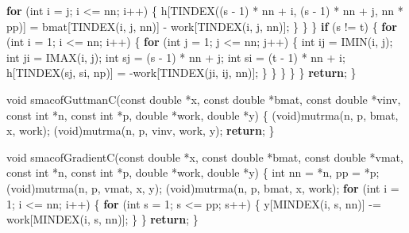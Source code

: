 \documentclass[12pt,]{article}
\newenvironment{Shaded}{\begin{snugshade}}{\end{snugshade}}
\newcommand{\DataTypeTok}[1]{\textcolor[rgb]{0.13,0.29,0.53}{#1}}
\newcommand{\DecValTok}[1]{\textcolor[rgb]{0.00,0.00,0.81}{#1}}
\newcommand{\ControlFlowTok}[1]{\textcolor[rgb]{0.13,0.29,0.53}{\textbf{#1}}}
\newcommand{\NormalTok}[1]{#1}
\begin{document}
\begin{Shaded}
\begin{Highlighting}[]
                    \ControlFlowTok{for}\NormalTok{ (}\DataTypeTok{int}\NormalTok{ i = j; i <= nn; i++) \{}
\NormalTok{                        h[TINDEX((s - }\DecValTok{1}\NormalTok{) * nn + i, (s - }\DecValTok{1}\NormalTok{) * nn + j, nn * pp)] =}
\NormalTok{                            bmat[TINDEX(i, j, nn)] - work[TINDEX(i, j, nn)];}
\NormalTok{                    \}}
\NormalTok{                \}}
\NormalTok{            \}}
            \ControlFlowTok{if}\NormalTok{ (s != t) \{}
                \ControlFlowTok{for}\NormalTok{ (}\DataTypeTok{int}\NormalTok{ i = }\DecValTok{1}\NormalTok{; i <= nn; i++) \{}
                    \ControlFlowTok{for}\NormalTok{ (}\DataTypeTok{int}\NormalTok{ j = }\DecValTok{1}\NormalTok{; j <= nn; j++) \{}
                        \DataTypeTok{int}\NormalTok{ ij = IMIN(i, j);}
                        \DataTypeTok{int}\NormalTok{ ji = IMAX(i, j);}
                        \DataTypeTok{int}\NormalTok{ sj = (s - }\DecValTok{1}\NormalTok{) * nn + j;}
                        \DataTypeTok{int}\NormalTok{ si = (t - }\DecValTok{1}\NormalTok{) * nn + i;}
\NormalTok{                        h[TINDEX(sj, si, np)] = -work[TINDEX(ji, ij, nn)];}
\NormalTok{                    \}}
\NormalTok{                \}}
\NormalTok{            \}}
\NormalTok{        \}}
\NormalTok{    \}}
    \ControlFlowTok{return}\NormalTok{;}
\NormalTok{\}}

\DataTypeTok{void}\NormalTok{ smacofGuttmanC(}\DataTypeTok{const} \DataTypeTok{double}\NormalTok{ *x, }\DataTypeTok{const} \DataTypeTok{double}\NormalTok{ *bmat, }\DataTypeTok{const} \DataTypeTok{double}\NormalTok{ *vinv,}
                    \DataTypeTok{const} \DataTypeTok{int}\NormalTok{ *n, }\DataTypeTok{const} \DataTypeTok{int}\NormalTok{ *p, }\DataTypeTok{double}\NormalTok{ *work, }\DataTypeTok{double}\NormalTok{ *y) \{}
\NormalTok{    (}\DataTypeTok{void}\NormalTok{)mutrma(n, p, bmat, x, work);}
\NormalTok{    (}\DataTypeTok{void}\NormalTok{)mutrma(n, p, vinv, work, y);}
    \ControlFlowTok{return}\NormalTok{;}
\NormalTok{\}}

\DataTypeTok{void}\NormalTok{ smacofGradientC(}\DataTypeTok{const} \DataTypeTok{double}\NormalTok{ *x, }\DataTypeTok{const} \DataTypeTok{double}\NormalTok{ *bmat, }\DataTypeTok{const} \DataTypeTok{double}\NormalTok{ *vmat,}
                     \DataTypeTok{const} \DataTypeTok{int}\NormalTok{ *n, }\DataTypeTok{const} \DataTypeTok{int}\NormalTok{ *p, }\DataTypeTok{double}\NormalTok{ *work, }\DataTypeTok{double}\NormalTok{ *y) \{}
    \DataTypeTok{int}\NormalTok{ nn = *n, pp = *p;}
\NormalTok{    (}\DataTypeTok{void}\NormalTok{)mutrma(n, p, vmat, x, y);}
\NormalTok{    (}\DataTypeTok{void}\NormalTok{)mutrma(n, p, bmat, x, work);}
    \ControlFlowTok{for}\NormalTok{ (}\DataTypeTok{int}\NormalTok{ i = }\DecValTok{1}\NormalTok{; i <= nn; i++) \{}
        \ControlFlowTok{for}\NormalTok{ (}\DataTypeTok{int}\NormalTok{ s = }\DecValTok{1}\NormalTok{; s <= pp; s++) \{}
\NormalTok{            y[MINDEX(i, s, nn)] -= work[MINDEX(i, s, nn)];}
\NormalTok{        \}}
\NormalTok{    \}}
    \ControlFlowTok{return}\NormalTok{;}
\NormalTok{\}}


\end{Highlighting}
\end{Shaded}
\end{document}
